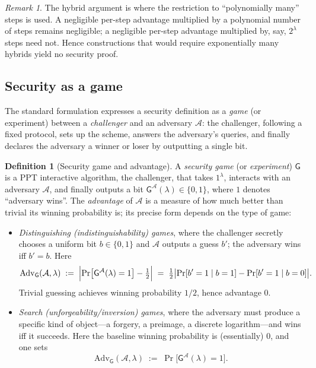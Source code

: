 \documentclass[11pt,a4paper]{article}
\theoremstyle{definition}
\newtheorem{definition}[theorem]{Definition}
\theoremstyle{remark}
\newtheorem{remark}[theorem]{Remark}
\begin{document}
\begin{remark}\label{model:rem:hybrid-poly}
The hybrid argument is where the restriction to ``polynomially many''
steps is used. A negligible per-step advantage multiplied by a
polynomial number of steps remains negligible; a negligible per-step
advantage multiplied by, say, \(2^\lambda\) steps need not. Hence
constructions that would require exponentially many hybrids yield no
security proof.
\end{remark}

\subsection{Security as a game}\label{model:subsec:games}

The standard formulation expresses a security definition as a
\emph{game} (or experiment) between a \emph{challenger} and an adversary
\(\mathcal{A}\): the challenger, following a fixed protocol, sets up
the scheme, answers the adversary's queries, and finally declares the
adversary a winner or loser by outputting a single bit.

\begin{definition}[Security game and advantage]\label{model:def:game}
A \emph{security game} (or \emph{experiment}) \(\mathsf{G}\) is a PPT
interactive algorithm, the challenger, that takes \(1^\lambda\),
interacts with an adversary \(\mathcal{A}\), and finally outputs a bit
\(\mathsf{G}^{\mathcal{A}}(\lambda) \in \{0,1\}\), where \(1\) denotes
``adversary wins''. The \emph{advantage} of \(\mathcal{A}\) is a
measure of how much better than trivial its winning probability is;
its precise form depends on the type of game:
\begin{itemize}
\item \emph{Distinguishing (indistinguishability) games}, where the
  challenger secretly chooses a uniform bit \(b\in\{0,1\}\) and
  \(\mathcal{A}\) outputs a guess \(b'\); the adversary wins iff
  \(b'=b\). Here
  \[
    \mathrm{Adv}_{\mathsf{G}}(\mathcal{A},\lambda)
    \;:=\; \Bigl| \Pr\bigl[\mathsf{G}^{\mathcal{A}}(\lambda)=1\bigr]
                  - \tfrac{1}{2} \Bigr|
    \;=\; \tfrac12\bigl|\Pr[b'=1\mid b=1]-\Pr[b'=1\mid b=0]\bigr|.
  \]
  Trivial guessing achieves winning probability \(1/2\), hence
  advantage \(0\).
\item \emph{Search (unforgeability/inversion) games}, where the
  adversary must produce a specific kind of object---a forgery, a
  preimage, a discrete logarithm---and wins iff it succeeds. Here the
  baseline winning probability is (essentially) \(0\), and one sets
  \[
    \mathrm{Adv}_{\mathsf{G}}(\mathcal{A},\lambda)
    \;:=\; \Pr\bigl[\mathsf{G}^{\mathcal{A}}(\lambda)=1\bigr].
  \]
\end{itemize}
\end{definition}
\end{document}
